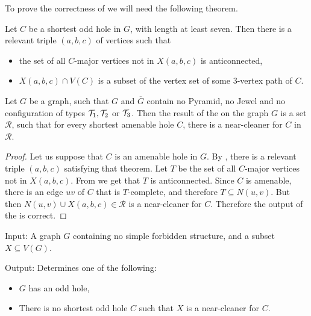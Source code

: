 To prove the correctness of  we will need the following theorem.

\begin{theorem}
	\label{thm:91}
	Let $C$ be a shortest odd hole in $G$, with length at least seven. Then there is a relevant triple $(a, b, c)$ of vertices such that
	\begin{itemize}
		\item the set of all $C$-major vertices not in $X(a, b, c)$ is anticonnected,
		\item $X(a, b, c) \cap V(C)$ is a subset of the vertex set of some 3-vertex path of $C$.
	\end{itemize}
\end{theorem}

\begin{theorem}
	Let $G$ be a graph, such that $G$ and $\overline{G}$ contain no Pyramid, no Jewel and no configuration of types $\mathcal{T}_1, \mathcal{T}_2$ or $\mathcal{T}_3$. Then the result of the  on the graph $G$ is a set $\mathcal{R}$, such that for every shortest amenable hole $C$, there is a near-cleaner for $C$ in $\mathcal{R}$.
\end{theorem}
\begin{proof}
	Let us suppose that $C$ is an amenable hole in $G$. By , there is a relevant triple $(a, b, c)$ satisfying that theorem. Let $T$ be the set of all $C$-major vertices not in $X(a,b,c)$. From  we get that $T$ is anticonnected. Since $C$ is amenable, there is an edge $uv$ of $C$ that is $T$-complete, and therefore $T \subseteq N(u, v)$. But then $N(u, v) \cup X(a, b, c) \in \mathcal{R}$ is a near-cleaner for $C$. Therefore the output of the  is correct.
\end{proof}

\begin{alg}
	\label{alg:testNearCleaner}
	Input: A graph $G$ containing no simple forbidden structure, and a subset $X \subseteq V(G)$.

	\noindent Output: Determines one of the following:
	\begin{itemize}
		\item $G$ has an odd hole,
		\item There is no shortest odd hole $C$ such that $X$ is a near-cleaner for $C$.
	\end{itemize}
\end{alg}

